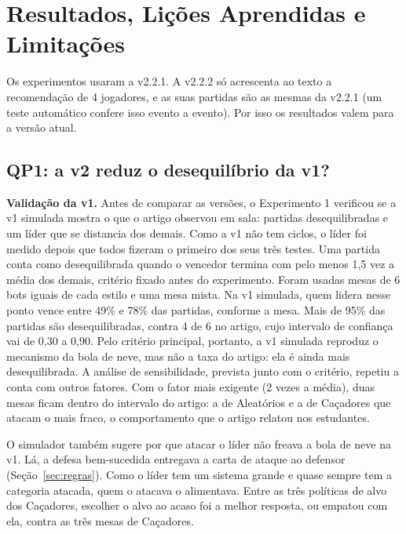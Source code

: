 \section{Resultados, Lições Aprendidas e Limitações}
\label{sec:resultados}

Os experimentos usaram a v2.2.1. A v2.2.2 só acrescenta ao texto a recomendação de 4 jogadores, e as suas
partidas são as mesmas da v2.2.1 (um teste automático confere isso evento a evento). Por isso os resultados
valem para a versão atual.

\subsection{QP1: a v2 reduz o desequilíbrio da v1?}
\label{sec:qp1}

\textbf{Validação da v1.} Antes de comparar as versões, o Experimento 1 verificou se a v1 simulada mostra o que o
artigo observou em sala: partidas desequilibradas e um líder que se distancia dos demais. Como a v1 não
tem ciclos, o líder foi
medido depois que todos fizeram o primeiro dos seus três testes. Uma partida conta como desequilibrada quando o
vencedor termina com pelo menos 1,5 vez a média dos demais, critério fixado antes do experimento. Foram usadas
mesas de 6 bots iguais de cada estilo e uma mesa mista.
Na v1 simulada, quem lidera nesse ponto vence entre 49\% e 78\% das partidas, conforme a mesa. Mais de 95\% das
partidas são desequilibradas, contra 4 de 6 no artigo, cujo intervalo de confiança vai de 0,30 a 0,90.
Pelo critério principal, portanto, a v1 simulada reproduz o mecanismo da bola de neve, mas não a taxa do artigo:
ela é ainda mais desequilibrada. A análise de sensibilidade, prevista junto com o critério, repetiu a conta com
outros fatores. Com o fator mais exigente (2 vezes a média), duas mesas ficam dentro do intervalo do artigo: a
de Aleatórios e a de Caçadores que atacam o mais fraco, o comportamento que o artigo relatou nos estudantes.

O simulador também sugere por que atacar o líder não freava a bola de neve na v1. Lá, a defesa bem-sucedida
entregava a carta de ataque ao defensor (Seção~\ref{sec:regras}). Como o líder tem um sistema grande e quase
sempre tem a categoria atacada, quem o atacava o alimentava. Entre as três políticas de alvo dos Caçadores,
escolher o alvo ao acaso foi a melhor resposta, ou empatou com ela, contra as três mesas de Caçadores.

